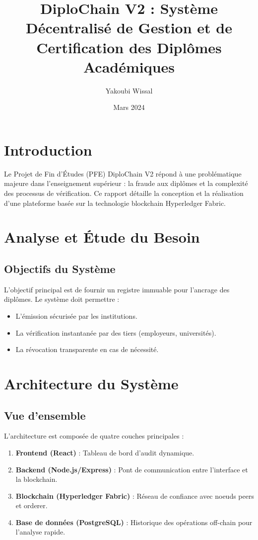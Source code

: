 \documentclass[12pt,a4paper]{report}
\title{DiploChain V2 : Système Décentralisé de Gestion et de Certification des Diplômes Académiques}
\author{Yakoubi Wissal}
\date{Mars 2024}
\begin{document}
\maketitle

\tableofcontents

\chapter{Introduction}
Le Projet de Fin d'Études (PFE) DiploChain V2 répond à une problématique majeure dans l'enseignement supérieur : la fraude aux diplômes et la complexité des processus de vérification. Ce rapport détaille la conception et la réalisation d'une plateforme basée sur la technologie blockchain Hyperledger Fabric.

\chapter{Analyse et Étude du Besoin}
\section{Objectifs du Système}
L'objectif principal est de fournir un registre immuable pour l'ancrage des diplômes. Le système doit permettre :
\begin{itemize}
    \item L'émission sécurisée par les institutions.
    \item La vérification instantanée par des tiers (employeurs, universités).
    \item La révocation transparente en cas de nécessité.
\end{itemize}

\chapter{Architecture du Système}
\section{Vue d'ensemble}
L'architecture est composée de quatre couches principales :
\begin{enumerate}
    \item \textbf{Frontend (React)} : Tableau de bord d'audit dynamique.
    \item \textbf{Backend (Node.js/Express)} : Pont de communication entre l'interface et la blockchain.
    \item \textbf{Blockchain (Hyperledger Fabric)} : Réseau de confiance avec noeuds peers et orderer.
    \item \textbf{Base de données (PostgreSQL)} : Historique des opérations off-chain pour l'analyse rapide.
\end{enumerate}
\end{document}
